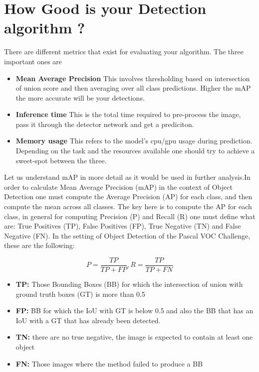 \documentclass{article}
\begin{document}
\section{How Good is your Detection algorithm ?}

There are different metrics that exist for evaluating your algorithm. The three important ones are 
\begin{itemize}

\item \textbf{Mean Average Precision} This involves thresholding based on intersection of union score and then averaging over all class predictions. Higher the mAP the more accurate will be your detections.

\item \textbf{Inference time} This is the total time required to pre-process the image, pass it through the detector network and get a prediciton. 

\item \textbf{Memory usage} This refers to the model's cpu/gpu usage during prediction. Depending on the task and the resources available one should try to achieve a sweet-spot between the three.

\end{itemize}


Let us understand mAP in more detail as it would be used in further analysis.In order to calculate Mean Average Precision (mAP) in the context of Object Detection one must compute the Average Precision (AP) for each class, and then compute the mean across all classes. The key here is to compute the AP for each class, in general for computing Precision (P) and Recall (R) one must define what are: True Positives (TP), False Positives (FP), True Negative (TN) and False Negative (FN). In the setting of Object Detection of the Pascal VOC Challenge, these are the following:

\begin{equation}
P=\frac{TP}{TP+FP}, R=\frac{TP}{TP+FN}
\end{equation}

\begin{itemize}
\item \textbf{TP:} Those Bounding Boxes (BB) for which the intersection of union with ground truth boxes (GT) is more than 0.5
\item \textbf{FP:} BB for which the IoU with GT is below 0.5 and also the BB that has an IoU with a GT that has already been detected.
\item \textbf{TN:} there are no true negative, the image is expected to contain at least one object
\item \textbf{FN:} Those images where the method failed to produce a BB
\end{itemize}
\end{document}
